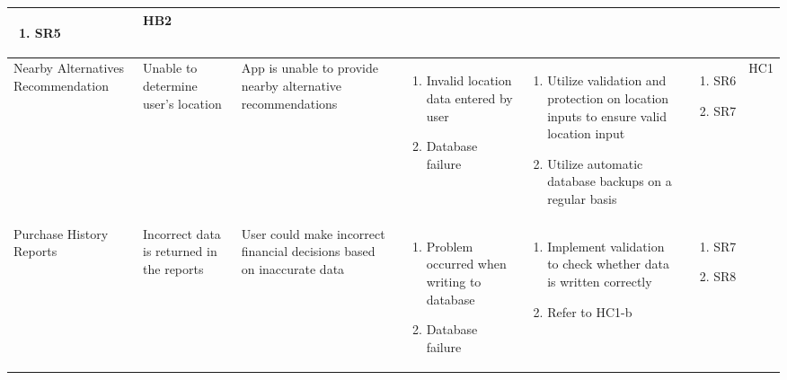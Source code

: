 \documentclass{article}
\begin{document}
\begin{landscape}
\begin{longtable}{|p{}|p{}|p{}|p{}|p{}|p{}|p{}|}
\begin{enumerate}[label=\alph*., leftmargin=*]
            \item SR5
        \end{enumerate}
        & HB2 \\
        \hline
        Nearby Alternatives Recommendation
        & Unable to determine user's location
        & App is unable to provide nearby alternative recommendations
        & \begin{enumerate}[label=\alph*., leftmargin=*]
            \item Invalid location data entered by user
            \item Database failure
        \end{enumerate}
        & \begin{enumerate}[label=\alph*., leftmargin=*]
            \item Utilize validation and protection on location inputs to ensure valid location input
            \item Utilize automatic database backups on a regular basis
        \end{enumerate}
        & \begin{enumerate}[label=\alph*., leftmargin=*]
            \item SR6
            \item SR7
        \end{enumerate}
        & HC1 \\
        \hline
        Purchase History Reports
        & Incorrect data is returned in the reports
        & User could make incorrect financial decisions based on inaccurate data
        & \begin{enumerate}[label=\alph*., leftmargin=*]
            \item Problem occurred when writing to database
            \item Database failure
        \end{enumerate}
        & \begin{enumerate}[label=\alph*., leftmargin=*]
            \item Implement validation to check whether data is written correctly
            \item Refer to HC1-b
        \end{enumerate}
        & \begin{enumerate}[label=\alph*., leftmargin=*]
            \item SR7
            \item SR8
        \end{enumerate}

\end{longtable}
\end{landscape}
\end{document}
